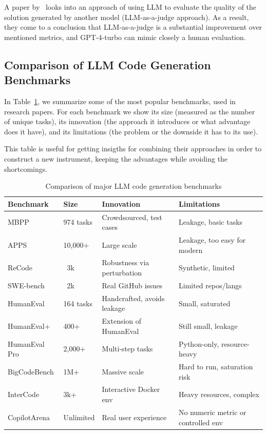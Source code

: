 A paper by~\cite{crupi2025effectiveness} looks into an approach of using LLM to evaluate the quality of the solution generated by another model (LLM-as-a-judge approach).
As a result, they come to a conclusion that LLM-as-a-judge is a substantial improvement over mentioned metrics, and GPT-4-turbo can mimic closely a human evaluation.

\subsection{Comparison of LLM Code Generation Benchmarks}

In Table~\ref{tab:bench-compare-table}, we summarize some of the most popular benchmarks, used in research papers.
For each benchmark we show its size (measured as the number of unique tasks), its innovation (the approach it introduces or what advantage does it have), and its limitations (the problem or the downside it has to its use).

This table is useful for getting insigths for combining their approaches in order to construct a new instrument, keeping the advantages while avoiding the shortcomings.

\begin{table}[h!]
    \centering
    \begin{tabular}{|l|l|p{5.3cm}|p{5.3cm}|}
        \hline
        \textbf{Benchmark} & \textbf{Size} & \textbf{Innovation} & \textbf{Limitations} \\
        \hline
        MBPP & 974 tasks & Crowdsourced, test cases & Leakage, basic tasks \\
        \hline
        APPS & 10,000+ & Large scale & Leakage, too easy for modern \\
        \hline
        ReCode & ~3k & Robustness via perturbation & Synthetic, limited \\
        \hline
        SWE-bench & ~2k & Real GitHub issues & Limited repos/langs \\
        \hline
        HumanEval & 164 tasks & Handcrafted, avoids leakage & Small, saturated \\
        \hline
        HumanEval+ & 400+ & Extension of HumanEval & Still small, leakage \\
        \hline
        HumanEval Pro & 2,000+ & Multi-step tasks & Python-only, resource-heavy \\
        \hline
        BigCodeBench & 1M+ & Massive scale & Hard to run, saturation risk \\
        \hline
        InterCode & 3k+  & Interactive Docker env & Heavy resources, complex \\
        \hline
        CopilotArena & Unlimited & Real user experience & No numeric metric or controlled env \\
        \hline
    \end{tabular}
    \caption{Comparison of major LLM code generation benchmarks}\label{tab:bench-compare-table}
\end{table}



